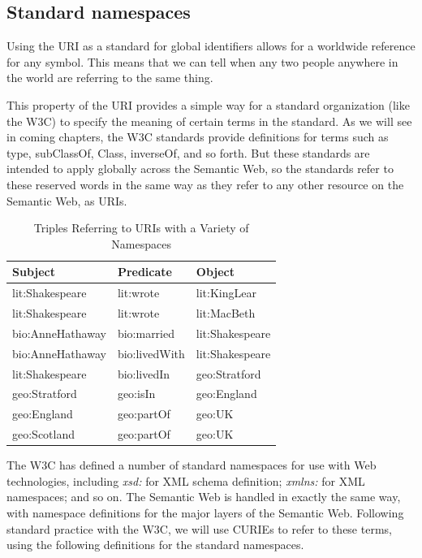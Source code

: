 \subsection{Standard namespaces}

Using the URI as a standard for global identifiers allows for a
worldwide reference for any symbol. This means that we can tell when any
two people anywhere in the world are referring to the same thing.

This property of the URI provides a simple way for a standard
organization (like the W3C) to specify the meaning of certain terms in
the standard. As we will see in coming chapters, the W3C standards
provide definitions for terms such as type, subClassOf, Class,
inverseOf, and so forth. But these standards are intended to apply
globally across the Semantic Web, so the standards refer to these reserved words in the same way as they refer to any other
resource on the Semantic Web, as URIs.

\begin{table}[h]
\centering
\begin{tabular}{||l l l ||} 
 \hline
 Subject&Predicate&Object \\ [0.5ex] 
 \hline\hline
lit:Shakespeare&lit:wrote&lit:KingLear\\
lit:Shakespeare&lit:wrote&lit:MacBeth\\
bio:AnneHathaway&bio:married&lit:Shakespeare\\
bio:AnneHathaway&bio:livedWith&lit:Shakespeare\\
lit:Shakespeare&bio:livedIn&geo:Stratford\\
geo:Stratford&geo:isIn&geo:England\\
geo:England&geo:partOf&geo:UK\\
geo:Scotland&geo:partOf&geo:UK\\
\hline
\end{tabular}
\caption{Triples Referring to URIs with a Variety of Namespaces}
\label{tab:ch3.8}
\end{table}



The W3C has defined a number of standard namespaces for use with Web
technologies, including \emph{xsd:} for XML schema definition;
\emph{xmlns:} for XML namespaces; and so on. The Semantic Web is handled
in exactly the same way, with namespace definitions for the major layers
of the Semantic Web. Following standard practice with the W3C, we will
use CURIEs to refer to these terms, using the following definitions for
the standard namespaces.

